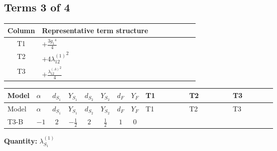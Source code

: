\documentclass[8pt]{article}
\begin{document}
\begin{landscape}
\subsection*{Terms 3 of 4}
\begin{center}
\begin{tabular}{@{}c >{\raggedright\arraybackslash}p{0.82\linewidth}@{}}
\toprule
Column & Representative term structure \\
\midrule
T1 & \(\displaystyle +\frac{3 {g_1}^4}{4}\) \\
\midrule
T2 & \(\displaystyle +4 {\lambda_{12}^{(1)}}^2\) \\
\midrule
T3 & \(\displaystyle +\frac{{\lambda_{12}^{(A)}}^2}{4}\) \\
\midrule
\bottomrule
\end{tabular}
\end{center}
\smallskip
\tiny
\begin{longtable}{@{}llcccccc >{\raggedright\arraybackslash}p{0.21\linewidth} >{\raggedright\arraybackslash}p{0.21\linewidth} >{\raggedright\arraybackslash}p{0.21\linewidth}@{}}
\toprule
Model & $\alpha$ & $d_{S_1}$ & $Y_{S_1}$ & $d_{S_2}$ & $Y_{S_2}$ & $d_F$ & $Y_F$ & T1 & T2 & T3 \\
\midrule
\endfirsthead
\toprule
Model & $\alpha$ & $d_{S_1}$ & $Y_{S_1}$ & $d_{S_2}$ & $Y_{S_2}$ & $d_F$ & $Y_F$ & T1 & T2 & T3 \\
\midrule
\endhead
T3-B & $-1$ & $2$ & $-\frac{1}{2}$ & $2$ & $\frac{1}{2}$ & $1$ & $0$ & \scriptsize\adjustbox{max width=\linewidth}{$\begin{gathered} +\frac{3 {g_1}^4}{4}\end{gathered}$} & \scriptsize\adjustbox{max width=\linewidth}{$\begin{gathered} +4 {\lambda_{12}^{(1)}}^2\end{gathered}$} & \scriptsize\adjustbox{max width=\linewidth}{$\begin{gathered} +\frac{{\lambda_{12}^{(A)}}^2}{4}\end{gathered}$} \\
\midrule
\bottomrule
\end{longtable}
\clearpage
\noindent\textbf{Quantity: }$\lambda_{S_1}^{(1)}$\par\smallskip

\end{landscape}
\end{document}
